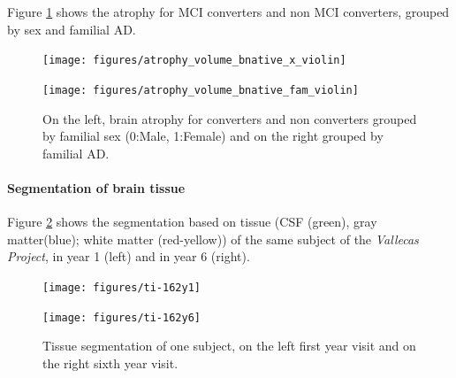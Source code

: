 \documentclass[11pt]{article}
\theoremstyle{definition}
\theoremstyle{remark}
\begin{document}
Figure \ref{fig:braingroupviol} shows the atrophy for MCI converters and non MCI converters, grouped by sex and familial AD.

\begin{figure}[!htb]
    \centering
    \begin{minipage}{.45\textwidth}
        \centering
        \texttt{[image: figures/atrophy\_volume\_bnative\_x\_violin]} %
        \label{fig:braingroupviol-a}
    \end{minipage}%
    \hfill
    \begin{minipage}{0.45\textwidth}
        \centering
        \texttt{[image: figures/atrophy\_volume\_bnative\_fam\_violin]}
        \label{fig:braingroupviol-b}
    \end{minipage}
    \caption{On the left, brain atrophy for converters and non converters grouped by familial sex (0:Male, 1:Female) and on the right grouped by familial AD.}
    \label{fig:braingroupviol}
\end{figure}


\paragraph*{Segmentation of brain tissue}

Figure \ref{fig:tissueseg} shows the segmentation based on tissue (CSF (green), gray matter(blue); white matter (red-yellow)) of the same subject of the \emph{Vallecas Project}, in year 1 (left) and in year 6 (right).

\begin{figure}[!htb]
    \centering
    \begin{minipage}{.95\textwidth}
        \centering
        \texttt{[image: figures/ti-162y1]} %
        \label{fig:braingroupviol-a}
    \end{minipage}%
    \hfill
    \begin{minipage}{0.95\textwidth}
        \centering
        \texttt{[image: figures/ti-162y6]}
        \label{fig:braingroupviol-b}
    \end{minipage}
    \caption{Tissue segmentation of one subject, on the left first year visit and on the right sixth year visit.}
    \label{fig:tissueseg}
\end{figure}
\end{document}
